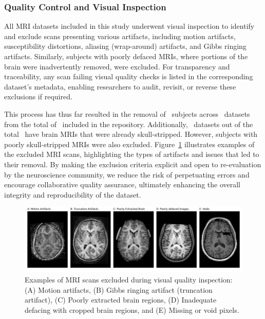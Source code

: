 \subsubsection{Quality Control and Visual Inspection}

All MRI datasets included in this study underwent visual inspection to identify and exclude scans presenting various artifacts, 
including motion artifacts, susceptibility distortions, aliasing (wrap-around) artifacts, and Gibbs ringing artifacts. 
Similarly, subjects with poorly defaced MRIs, where portions of the brain were inadvertently removed, were excluded. For transparency and 
traceability, any scan failing visual quality checks is listed in the corresponding dataset's metadata, enabling researchers to audit, 
revisit, or reverse these exclusions if required.

This process has thus far resulted in the removal of \TotalNumSubjectsRemoved\ subjects across \TotalNumDatasetsWithSubjectsRemoved\ datasets 
from the total of \NumDatasets\ included in the repository. Additionally, \NumDatasetsAlreadySkullStripped\ datasets out of the total \NumDatasets\ 
have brain MRIs that were already skull-stripped. However, subjects with poorly skull-stripped MRIs were also excluded. Figure~\ref{dropped_subject} 
illustrates examples of the excluded MRI scans, highlighting the types of artifacts and issues that led to their removal. By making the exclusion 
criteria explicit and open to re-evaluation by the neuroscience community, we reduce the risk of perpetuating errors and encourage collaborative quality assurance, 
ultimately enhancing the overall integrity and reproducibility of the dataset.


\begin{figure}[htbp]\begin{center}\includegraphics[width=\linewidth]{figures/dropped_subjects.png}
    \caption{
        Examples of MRI scans excluded during visual quality inspection:
        (A) Motion artifacts, 
        (B) Gibbs ringing artifact (truncation artifact), 
        (C) Poorly extracted brain regions, 
        (D) Inadequate defacing with cropped brain regions, 
        and (E) Missing or void pixels.
    }
    \label{dropped_subject}\end{center}
\end{figure}


